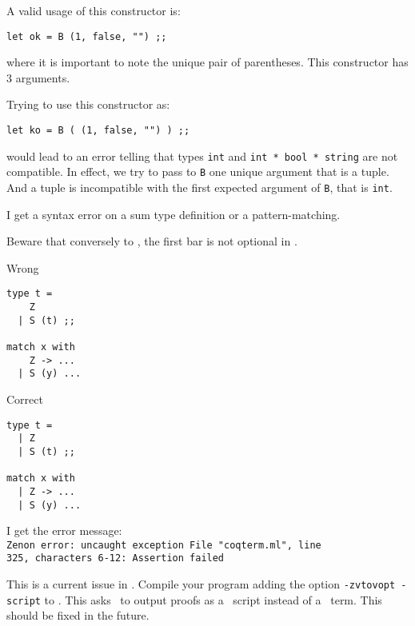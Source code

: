 \documentclass[10pt,a4paper]{article}
\begin{document}
\begin{faqitem}
A valid usage of this constructor is:
{\small
\begin{lstlisting}
let ok = B (1, false, "") ;;
\end{lstlisting}}

\noindent where it is important to note the unique pair of parentheses. This
constructor has 3 arguments.

Trying to use this constructor as:

{\small
\begin{lstlisting}
let ko = B ( (1, false, "") ) ;;
\end{lstlisting}}

\noindent would lead to an error telling that types {\tt int} and
{\tt int * bool * string} are not compatible. In effect, we try to pass to
{\tt B} one unique argument that is a tuple. And a tuple is incompatible with
the first expected argument of {\tt B}, that is {\tt int}.
\end{faqitem}



\bigskip
\begin{faqitem}
I get a syntax error on a sum type definition or a pattern-matching.

\medskip
{}
Beware that conversely to \ocaml, the first bar is not optional in \focal.

\begin{minipage}{6.2cm}
Wrong
{\small
\begin{lstlisting}
type t =
    Z
  | S (t) ;;

match x with
    Z -> ...
  | S (y) ...
\end{lstlisting}}
\end{minipage}\hskip1cm
\begin{minipage}{6.2cm}
Correct
{\small
\begin{lstlisting}
type t =
  | Z
  | S (t) ;;

match x with
  | Z -> ...
  | S (y) ...
\end{lstlisting}}
\end{minipage}
\end{faqitem}



\bigskip
\begin{faqitem}
I get the error message:\\
  \verb+Zenon error: uncaught exception File "coqterm.ml", line +\\
  \verb+325, characters 6-12: Assertion failed+

\medskip
{}
This is a current issue in \zenon. Compile your program
adding the option \verb+-zvtovopt -script+ to \focalizec. This asks
\zenon\ to output proofs as a \coq\ script instead of a \coq\ term. This should
be fixed in the future.
\end{faqitem}
\end{document}
